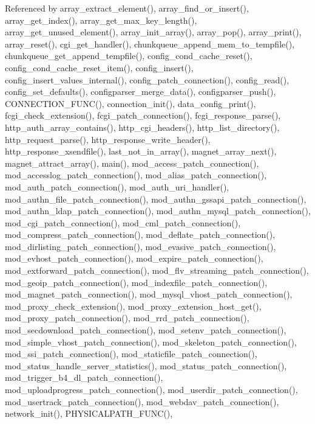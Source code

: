 Referenced by array\-\_\-extract\-\_\-element(), array\-\_\-find\-\_\-or\-\_\-insert(), array\-\_\-get\-\_\-index(), array\-\_\-get\-\_\-max\-\_\-key\-\_\-length(), array\-\_\-get\-\_\-unused\-\_\-element(), array\-\_\-init\-\_\-array(), array\-\_\-pop(), array\-\_\-print(), array\-\_\-reset(), cgi\-\_\-get\-\_\-handler(), chunkqueue\-\_\-append\-\_\-mem\-\_\-to\-\_\-tempfile(), chunkqueue\-\_\-get\-\_\-append\-\_\-tempfile(), config\-\_\-cond\-\_\-cache\-\_\-reset(), config\-\_\-cond\-\_\-cache\-\_\-reset\-\_\-item(), config\-\_\-insert(), config\-\_\-insert\-\_\-values\-\_\-internal(), config\-\_\-patch\-\_\-connection(), config\-\_\-read(), config\-\_\-set\-\_\-defaults(), configparser\-\_\-merge\-\_\-data(), configparser\-\_\-push(), C\-O\-N\-N\-E\-C\-T\-I\-O\-N\-\_\-\-F\-U\-N\-C(), connection\-\_\-init(), data\-\_\-config\-\_\-print(), fcgi\-\_\-check\-\_\-extension(), fcgi\-\_\-patch\-\_\-connection(), fcgi\-\_\-response\-\_\-parse(), http\-\_\-auth\-\_\-array\-\_\-contains(), http\-\_\-cgi\-\_\-headers(), http\-\_\-list\-\_\-directory(), http\-\_\-request\-\_\-parse(), http\-\_\-response\-\_\-write\-\_\-header(), http\-\_\-response\-\_\-xsendfile(), last\-\_\-not\-\_\-in\-\_\-array(), magnet\-\_\-array\-\_\-next(), magnet\-\_\-attract\-\_\-array(), main(), mod\-\_\-access\-\_\-patch\-\_\-connection(), mod\-\_\-accesslog\-\_\-patch\-\_\-connection(), mod\-\_\-alias\-\_\-patch\-\_\-connection(), mod\-\_\-auth\-\_\-patch\-\_\-connection(), mod\-\_\-auth\-\_\-uri\-\_\-handler(), mod\-\_\-authn\-\_\-file\-\_\-patch\-\_\-connection(), mod\-\_\-authn\-\_\-gssapi\-\_\-patch\-\_\-connection(), mod\-\_\-authn\-\_\-ldap\-\_\-patch\-\_\-connection(), mod\-\_\-authn\-\_\-mysql\-\_\-patch\-\_\-connection(), mod\-\_\-cgi\-\_\-patch\-\_\-connection(), mod\-\_\-cml\-\_\-patch\-\_\-connection(), mod\-\_\-compress\-\_\-patch\-\_\-connection(), mod\-\_\-deflate\-\_\-patch\-\_\-connection(), mod\-\_\-dirlisting\-\_\-patch\-\_\-connection(), mod\-\_\-evasive\-\_\-patch\-\_\-connection(), mod\-\_\-evhost\-\_\-patch\-\_\-connection(), mod\-\_\-expire\-\_\-patch\-\_\-connection(), mod\-\_\-extforward\-\_\-patch\-\_\-connection(), mod\-\_\-flv\-\_\-streaming\-\_\-patch\-\_\-connection(), mod\-\_\-geoip\-\_\-patch\-\_\-connection(), mod\-\_\-indexfile\-\_\-patch\-\_\-connection(), mod\-\_\-magnet\-\_\-patch\-\_\-connection(), mod\-\_\-mysql\-\_\-vhost\-\_\-patch\-\_\-connection(), mod\-\_\-proxy\-\_\-check\-\_\-extension(), mod\-\_\-proxy\-\_\-extension\-\_\-host\-\_\-get(), mod\-\_\-proxy\-\_\-patch\-\_\-connection(), mod\-\_\-rrd\-\_\-patch\-\_\-connection(), mod\-\_\-secdownload\-\_\-patch\-\_\-connection(), mod\-\_\-setenv\-\_\-patch\-\_\-connection(), mod\-\_\-simple\-\_\-vhost\-\_\-patch\-\_\-connection(), mod\-\_\-skeleton\-\_\-patch\-\_\-connection(), mod\-\_\-ssi\-\_\-patch\-\_\-connection(), mod\-\_\-staticfile\-\_\-patch\-\_\-connection(), mod\-\_\-status\-\_\-handle\-\_\-server\-\_\-statistics(), mod\-\_\-status\-\_\-patch\-\_\-connection(), mod\-\_\-trigger\-\_\-b4\-\_\-dl\-\_\-patch\-\_\-connection(), mod\-\_\-uploadprogress\-\_\-patch\-\_\-connection(), mod\-\_\-userdir\-\_\-patch\-\_\-connection(), mod\-\_\-usertrack\-\_\-patch\-\_\-connection(), mod\-\_\-webdav\-\_\-patch\-\_\-connection(), network\-\_\-init(), P\-H\-Y\-S\-I\-C\-A\-L\-P\-A\-T\-H\-\_\-\-F\-U\-N\-C(), 